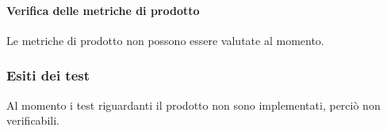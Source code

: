 	\paragraph{Verifica delle metriche di prodotto} 

	Le metriche di prodotto non possono essere valutate al momento.


\subsubsection{Esiti dei test}
	Al momento i test riguardanti il prodotto non sono implementati, perciò non verificabili. 
	
